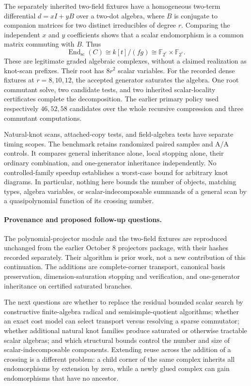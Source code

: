 The separately inherited two-field fixtures have a homogeneous two-term
differential $d=xI+yB$ over a two-dot algebra, where $B$ is conjugate to
companion matrices for two distinct irreducibles of degree $r$. Comparing
the independent $x$ and $y$ coefficients shows that a scalar endomorphism
is a common matrix commuting with $B$. Thus
\[
 \operatorname{End}_{\mathrm{sc}}(C)
  \cong k[t]/(fg)\cong\mathbb F_{2^r}\times\mathbb F_{2^r}.
\]
These are legitimate graded algebraic complexes, without a claimed
realization as knot-scan prefixes. Their root has $8r^2$ scalar variables.
For the recorded dense fixtures at $r=8,10,12$, the accepted generator
saturates the algebra. One root commutant solve, two candidate tests, and
two inherited scalar-locality certificates complete the decomposition.
The earlier primary policy used respectively $46,52,58$ candidates over
the whole recursive compression and three commutant computations.

Natural-knot scans, attached-copy tests, and field-algebra tests have separate
timing scopes. The benchmark retains randomized paired samples and A/A
controls. It compares general inheritance alone, local stopping alone,
their ordinary combination, and one-generator inheritance independently.
No controlled-family speedup establishes a worst-case bound for arbitrary
knot diagrams. In particular, nothing here bounds the number of objects,
matching types, algebra variables, or scalar-indecomposable summands of a
general scan by a quasipolynomial function of its crossing number.

\paragraph{Provenance and proposed follow-up questions.}
The polynomial-projector module and the two-field fixtures are reproduced
unchanged from the earlier October 8 projectors package, with their hashes
recorded separately. Their algorithm is prior work, not a new contribution
of this continuation. The additions are complete-corner transport,
canonical basis preservation, dimension-saturation stopping and verification,
and one-generator inheritance on certified saturated branches.

The next questions are whether to replace the residual bounded scalar search
by constructive finite-algebra radical and semisimple-quotient algorithms;
whether an exact cost model can select transport versus resolving a sparse
commutator; whether additional natural knot families produce saturated or
otherwise tractable scalar algebras; and which structural bounds control
the number and size of scalar-indecomposable components. Extending reuse
across the addition of a crossing is a different problem: a child corner
of the same complex inherits all endomorphisms by extension by zero, while
a newly glued complex can gain endomorphisms that have no ancestor.
